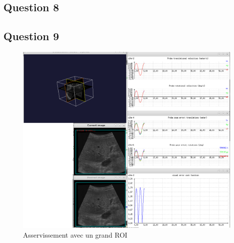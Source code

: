 \documentclass[a4paper,11pt]{article}
\begin{document}
\subsection{Question 8}
\begin{center}
\end{center}


\subsection{Question 9}
\begin{figure}[!h]
    \centering
    \includegraphics[width=1.0\textwidth]{./images/q9_large.png}
    \caption{Asservissement avec un grand ROI}
    \label{largeRoi}
\end{figure}
\end{document}
